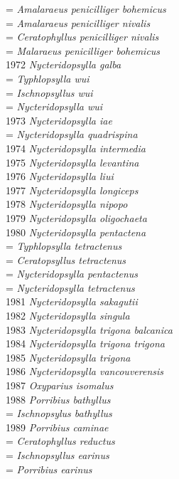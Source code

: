 \documentclass[
]{article}
\begin{document}
= \emph{Amalaraeus penicilliger bohemicus}\\
= \emph{Amalaraeus penicilliger nivalis}\\
= \emph{Ceratophyllus penicilliger nivalis}\\
= \emph{Malaraeus penicilliger bohemicus}\\
1972 \emph{Nycteridopsylla galba}\\
= \emph{Typhlopsylla wui}\\
= \emph{Ischnopsyllus wui}\\
= \emph{Nycteridopsylla wui}\\
1973 \emph{Nycteridopsylla iae}\\
= \emph{Nycteridopsylla quadrispina}\\
1974 \emph{Nycteridopsylla intermedia}\\
1975 \emph{Nycteridopsylla levantina}\\
1976 \emph{Nycteridopsylla liui}\\
1977 \emph{Nycteridopsylla longiceps}\\
1978 \emph{Nycteridopsylla nipopo}\\
1979 \emph{Nycteridopsylla oligochaeta}\\
1980 \emph{Nycteridopsylla pentactena}\\
= \emph{Typhlopsylla tetractenus}\\
= \emph{Ceratopsyllus tetractenus}\\
= \emph{Nycteridopsylla pentactenus}\\
= \emph{Nycteridopsylla tetractenus}\\
1981 \emph{Nycteridopsylla sakagutii}\\
1982 \emph{Nycteridopsylla singula}\\
1983 \emph{Nycteridopsylla trigona balcanica}\\
1984 \emph{Nycteridopsylla trigona trigona}\\
1985 \emph{Nycteridopsylla trigona}\\
1986 \emph{Nycteridopsylla vancouverensis}\\
1987 \emph{Oxyparius isomalus}\\
1988 \emph{Porribius bathyllus}\\
= \emph{Ischnopsylus bathyllus}\\
1989 \emph{Porribius caminae}\\
= \emph{Ceratophyllus reductus}\\
= \emph{Ischnopsyllus earinus}\\
= \emph{Porribius earinus}\\
\end{document}
